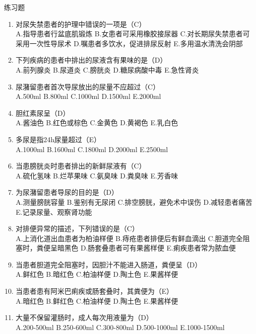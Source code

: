 \documentclass[11pt, a4paper]{ctexart}
\begin{document}
\begin{examplebox}{练习题}
\begin{enumerate}
    \item 对尿失禁患者的护理中错误的一项是（C）\\
    A.指导患者行盆底肌锻炼 \quad B.女患者可采用橡胶接尿器 \quad C.对长期尿失禁患者可采用一次性导尿术 \quad D.嘱患者多饮水，促进排尿反射 \quad E.多用温水清洗会阴部
    \item 下列疾病的患者中排出的尿液含有果味的是（D）\\
    A.前列腺炎 \quad B.尿道炎 \quad C.膀胱炎 \quad D.糖尿病酸中毒 \quad E.急性肾炎
    \item 尿潴留患者首次导尿放出的尿量不应超过（C）\\
    A.500ml \quad B.800ml \quad C.1000ml \quad D.1500ml \quad E.2000ml
    \item 胆红素尿呈（D）\\
    A.酱油色 \quad B.红色或棕色 \quad C.金黄色 \quad D.黄褐色 \quad E.乳白色
    \item 多尿是指24h尿量超过（E）\\
    A.1000ml \quad B.1600ml \quad C.1800ml \quad D.2000ml \quad E.2500ml
    \item 当患膀胱炎时患者排出的新鲜尿液有（C）\\
    A.硫化氢味 \quad B.烂苹果味 \quad C.氨臭味 \quad D.粪臭味 \quad E.芳香味
    \item 为尿潴留患者导尿的目的是（D）\\
    A.测量膀胱容量 \quad B.鉴别有无尿闭 \quad C.排空膀胱，避免术中误伤 \quad D.减轻患者痛苦 \quad E.记录尿量、观察肾功能
    \item 对排便异常的描述，下列错误的是（C）\\
    A.上消化道出血患者为柏油样便 \quad B.痔疮患者排便后有鲜血滴出 \quad C.胆道完全阻塞时，粪便呈暗黑色 \quad D.肠套叠患者可有果酱样便 \quad E.痢疾患者常为脓血便
    \item 当患者胆道完全阻塞时，因胆汁不能进入肠道，粪便呈（D）\\
    A.鲜红色 \quad B.暗红色 \quad C.柏油样便 \quad D.陶土色 \quad E.果酱样便
    \item 当患者患有阿米巴痢疾或肠套叠时，其粪便为（E）\\
    A.暗红色 \quad B.鲜红色 \quad C.柏油样便 \quad D.陶土色 \quad E.果酱样便
    \item 大量不保留灌肠时，成人每次用液量为（D）\\
    A.200-500ml \quad B.250-600ml \quad C.300-800ml \quad D.500-1000ml \quad E.1000-1500ml

\end{enumerate}
\end{examplebox}
\end{document}
